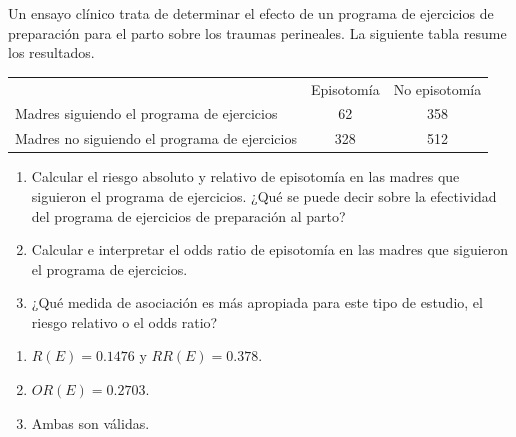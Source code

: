 {Un ensayo clínico trata de determinar el efecto de un programa de ejercicios de preparación para el parto sobre los traumas perineales.
La siguiente tabla resume los resultados.
\begin{center}
	\begin{tabular}{lcc}
		\toprule
		 & Episotomía & No episotomía\\
		 Madres siguiendo el programa de ejercicios & 62 & 358 \\
		 Madres no siguiendo el programa de ejercicios & 328 & 512\\
		\bottomrule
	\end{tabular}
\end{center}

\begin{enumerate}
\item Calcular el riesgo absoluto y relativo de episotomía en las madres que siguieron el programa de ejercicios.
¿Qué se puede decir sobre la efectividad del programa de ejercicios de preparación al parto?
\item Calcular e interpretar el odds ratio de episotomía en las madres que siguieron el programa de ejercicios.
\item ¿Qué medida de asociación es más apropiada para este tipo de estudio, el riesgo relativo o el odds ratio?
\end{enumerate}
}
{
\begin{enumerate}
\item $R(E)=0.1476$ y $RR(E)=0.378$.
\item $OR(E)=0.2703$.
\item Ambas son válidas.
\end{enumerate}
}
{}
